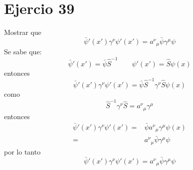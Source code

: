 \section*{Ejercio 39}
Mostrar que
\begin{equation*}
    {\bar{\psi}}'({x}') \gamma^\nu {\psi}' ({x}') = {a^\nu}_\mu \bar{\psi} \gamma^\mu \psi
\end{equation*}
Se sabe que:
\begin{equation*}
    {\bar{\psi}}'({x}') = \bar{\psi} \hat{S}^{-1} \qquad {\psi}'({x}')=\hat{S}\psi(x) 
\end{equation*}
entonces
\begin{equation*}
    {\bar{\psi}}'({x}') \gamma^\nu {\psi}' ({x}')  =  \bar{\psi} \hat{S}^{-1}  \gamma^\nu \hat{S}\psi(x) 
\end{equation*}
como 
\begin{equation*}
    \hat{S}^{-1}  \gamma^\nu \hat{S} = {a^\nu}_\mu \gamma^\mu
\end{equation*}
entonces 
\begin{align*}
    {\bar{\psi}}'({x}') \gamma^\nu {\psi}' ({x}') =& \bar{\psi} {a^\nu}_\mu \gamma^\mu\psi(x)  \\
    =& {a^\nu}_\mu \bar{\psi} \gamma^\mu \psi
\end{align*}
por lo tanto
\begin{equation*}
    {\bar{\psi}}'({x}') \gamma^\nu {\psi}' ({x}') = {a^\nu}_\mu \bar{\psi} \gamma^\mu \psi
\end{equation*}
